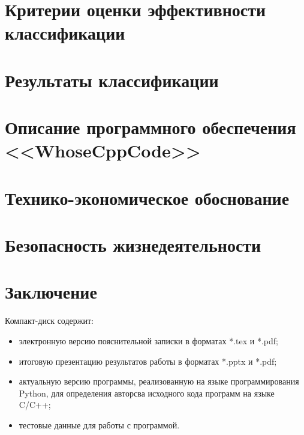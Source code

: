 \section{Критерии оценки эффективности классификации}\label{eval}

\newpage
\section{Результаты классификации}


\newpage
\section{Описание программного обеспечения <<WhoseCppCode>>}


% 

\clearpage
\section{Технико-экономическое обоснование}


\newpage
\section{Безопасность жизнедеятельности}

 
\newpage
\section*{Заключение}

 
 
 \newpage
 \renewcommand{\refname}{Список использованных источников}
 

 Компакт-диск содержит: 
 \begin{itemize}
 \item электронную версию пояснительной записки в форматах *.tex и *.pdf;
 \item итоговую презентацию результатов работы в форматах *.pptx и *.pdf;
 \item актуальную версию программы, реализованную на языке программирования Python, для определения авторсва исходного кода программ на языке C/C++;
 \item тестовые данные для работы с программой.
 \end{itemize}
 
